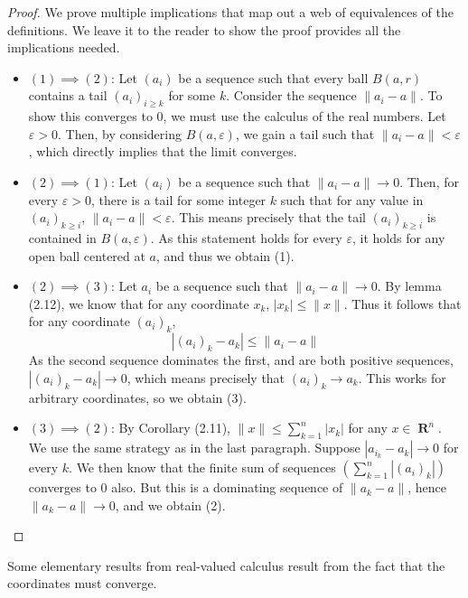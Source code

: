 \documentclass{report}
\DeclareMathOperator{\real}{\mathbf{R}}
\begin{document}
\begin{proof} We prove multiple implications that map out a web of equivalences of the definitions. We leave it to the reader to show the proof provides all the implications needed.

  \begin{itemize}
  \item $(1) \implies (2)$: Let $(a_i)$ be a sequence such that every ball $B(a,r)$ contains a tail $(a_i)_{i \geq k}$ for some $k$. Consider the sequence $\| a_i - a\|$. To show this converges to 0, we must use the calculus of the real numbers. Let $\varepsilon > 0$. Then, by considering $B(a,\varepsilon)$, we gain a tail such that $\| a_i - a \| < \varepsilon$, which directly implies that the limit converges.

  \item $(2) \implies (1)$: Let $(a_i)$ be a sequence such that $\| a_i - a \| \to 0$. Then, for every $\varepsilon > 0$, there is a tail for some integer $k$ such that for any value in $(a_i)_{k \geq i}$, $\| a_i - a \| < \varepsilon$. This means precisely that the tail $(a_i)_{k \geq i}$ is contained in $B(a,\varepsilon)$. As this statement holds for every $\varepsilon$, it holds for any open ball centered at $a$, and thus we obtain (1).

  \item $(2) \implies (3)$: Let $a_i$ be a sequence such that $\| a_i - a \| \to 0$. By lemma (2.12), we know that for any coordinate $x_k$, $|x_k| \leq \| x \|$. Thus it follows that for any coordinate $(a_i)_k$,
  \[ | (a_i)_k - a_k | \leq \| a_i - a \| \]
  As the second sequence dominates the first, and are both positive sequences, $|(a_i)_k - a_k| \to 0$, which means precisely that $(a_i)_k \to a_k$. This works for arbitrary coordinates, so we obtain (3).

  \item $(3) \implies (2)$: By Corollary (2.11), $\| x \| \leq \sum_{k = 1}^n |x_k|$ for any $x \in \real^n$. We use the same strategy as in the last paragraph. Suppose $|a_{i_k} - a_k| \to 0$ for every $k$. We then know that the finite sum of sequences $(\sum_{k = 1}^n |(a_i)_k|)$ converges to 0 also. But this is a dominating sequence of $\| a_k - a \|$, hence $\| a_k - a \| \to 0$, and we obtain (2).
  \end{itemize}
\end{proof}

Some elementary results from real-valued calculus result from the fact that the coordinates must converge.
\end{document}
